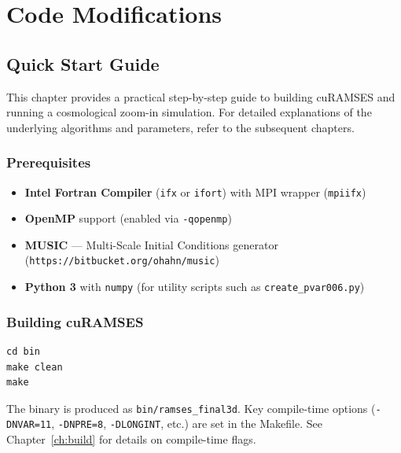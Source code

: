 \documentclass[11pt,fleqn]{book}
\begin{document}
\part{Code Modifications}

\chapter{Quick Start Guide}
\label{ch:quickstart}

This chapter provides a practical step-by-step guide to building cuRAMSES and running a cosmological zoom-in simulation. For detailed explanations of the underlying algorithms and parameters, refer to the subsequent chapters.

\section{Prerequisites}

\begin{itemize}[leftmargin=2em]
  \item \textbf{Intel Fortran Compiler} (\texttt{ifx} or \texttt{ifort}) with MPI wrapper (\texttt{mpiifx})
  \item \textbf{OpenMP} support (enabled via \texttt{-qopenmp})
  \item \textbf{MUSIC} --- Multi-Scale Initial Conditions generator (\texttt{https://bitbucket.org/ohahn/music})
  \item \textbf{Python 3} with \texttt{numpy} (for utility scripts such as \texttt{create\_pvar006.py})
\end{itemize}

\section{Building cuRAMSES}

\begin{codebox}
\begin{lstlisting}[style=bash,numbers=none]
cd bin
make clean
make
\end{lstlisting}
\end{codebox}

The binary is produced as \texttt{bin/ramses\_final3d}. Key compile-time options (\texttt{-DNVAR=11}, \texttt{-DNPRE=8}, \texttt{-DLONGINT}, etc.) are set in the Makefile. See Chapter~\ref{ch:build} for details on compile-time flags.
\end{document}
